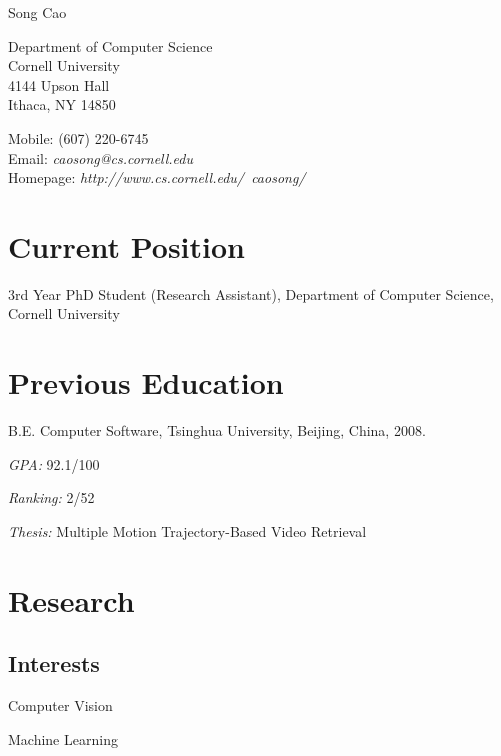 \documentclass[10pt,letterpaper]{article}
\def\name{Song Cao}
\renewenvironment{itemize}{
  \begin{list}{}{
    \setlength{\leftmargin}{1.5em}
    \setlength{\itemsep}{0.25em}
    \setlength{\parskip}{0pt}
    \setlength{\parsep}{0.25em}
  }
}{
  \end{list}
}
\begin{document}
{\huge \name}


\vspace{0.25in}

\begin{minipage}[t]{0.5\textwidth}
  Department of Computer Science \\
  Cornell University \\
  4144 Upson Hall \\
  Ithaca, NY 14850
\end{minipage}
\begin{minipage}[t]{0.5\textwidth}
  Mobile: (607) 220-6745 \\
  Email: \textit{caosong@cs.cornell.edu} \\
  Homepage: \textit{http://www.cs.cornell.edu/~caosong/} \\
\end{minipage}

\section*{Current Position}
3rd Year PhD Student (Research Assistant), Department of Computer
Science, Cornell University

\section*{Previous Education}
\begin{itemize}
    \item B.E. Computer Software, Tsinghua University, Beijing, China, 2008.

    \begin{itemize}
    \item \textit{GPA:}
      92.1/100
    \item \textit{Ranking:}
      2/52
    \item \textit{Thesis:}
      Multiple Motion Trajectory-Based Video Retrieval
    \end{itemize}
\end{itemize}

\section*{Research}
\subsection*{Interests}
\begin{itemize}
\item Computer Vision
\item Machine Learning
\end{itemize}
\end{document}
